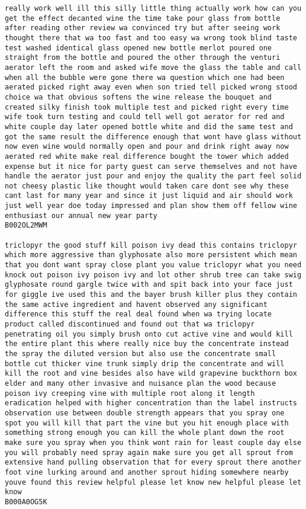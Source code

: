 \documentclass[11pt]{article}
\begin{document}
\begin{Verbatim}[commandchars=\\\{\}]
really work well ill this silly little thing actually work how can you get the effect decanted wine the time take pour glass from bottle after reading other review wa convinced try but after seeing work thought there that wa too fast and too easy wa wrong took blind taste test washed identical glass opened new bottle merlot poured one straight from the bottle and poured the other through the venturi aerator left the room and asked wife move the glass the table and call when all the bubble were gone there wa question which one had been aerated picked right away even when son tried tell picked wrong stood choice wa that obvious softens the wine release the bouquet and created silky finish took multiple test and picked right every time wife took turn testing and could tell well got aerator for red and white couple day later opened bottle white and did the same test and got the same result the difference enough that wont have glass without now even wine would normally open and pour and drink right away now aerated red white make real difference bought the tower which added expense but it nice for party guest can serve themselves and not have handle the aerator just pour and enjoy the quality the part feel solid not cheesy plastic like thought would taken care dont see why these cant last for many year and since it just liquid and air should work just well year doe today impressed and plan show them off fellow wine enthusiast our annual new year party
B002OL2MWM

triclopyr the good stuff kill poison ivy dead this contains triclopyr which more aggressive than glyphosate also more persistent which mean that you dont want spray close plant you value triclopyr what you need knock out poison ivy poison ivy and lot other shrub tree can take swig glyphosate round gargle twice with and spit back into your face just for giggle ive used this and the bayer brush killer plus they contain the same active ingredient and havent observed any significant difference this stuff the real deal found when wa trying locate product called discontinued and found out that wa triclopyr penetrating oil you simply brush onto cut active vine and would kill the entire plant this where really nice buy the concentrate instead the spray the diluted version but also use the concentrate small bottle cut thicker vine trunk simply drip the concentrate and will kill the root and vine besides also have wild grapevine buckthorn box elder and many other invasive and nuisance plan the wood because poison ivy creeping vine with multiple root along it length eradication helped with higher concentration than the label instructs observation use between double strength appears that you spray one spot you will kill that part the vine but you hit enough place with something strong enough you can kill the whole plant down the root make sure you spray when you think wont rain for least couple day else you will probably need spray again make sure you get all sprout from extensive hand pulling observation that for every sprout there another foot vine lurking around and another sprout hiding somewhere nearby youve found this review helpful please let know new helpful please let know
B000A0OG5K


\end{Verbatim}
\end{document}
